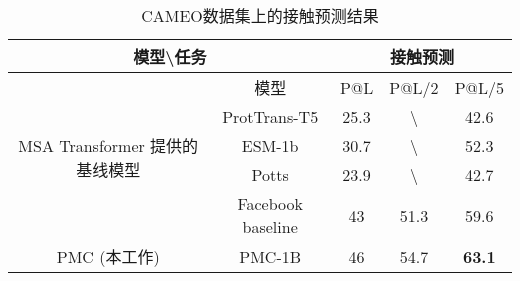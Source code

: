 \begin{table}[htbp]
    \centering
    \begin{tabular}{|cc|ccc|}
    \hline
    \multicolumn{2}{|c|}{模型\textbackslash{}任务} & \multicolumn{3}{c|}{接触预测}                                               \\ \hline
    \multicolumn{1}{|c|}{\multirow{5}{*}{MSA Transformer 提供的基线模型}} & 模型          & \multicolumn{1}{c|}{P@L} & \multicolumn{1}{c|}{P@L/2} & P@L/5         \\ \cline{2-5} 
    \multicolumn{1}{|c|}{} & ProtTrans-T5      & \multicolumn{1}{c|}{25.3} & \multicolumn{1}{c|}{\textbackslash{}} & 42.6 \\ \cline{2-5} 
    \multicolumn{1}{|c|}{} & ESM-1b            & \multicolumn{1}{c|}{30.7} & \multicolumn{1}{c|}{\textbackslash{}} & 52.3 \\ \cline{2-5} 
    \multicolumn{1}{|c|}{} & Potts             & \multicolumn{1}{c|}{23.9} & \multicolumn{1}{c|}{\textbackslash{}} & 42.7 \\ \cline{2-5} 
    \multicolumn{1}{|c|}{} & Facebook baseline & \multicolumn{1}{c|}{43}   & \multicolumn{1}{c|}{51.3}             & 59.6 \\ \hline
    \multicolumn{1}{|c|}{PMC (本工作)}                       & PMC-1B & \multicolumn{1}{c|}{46}  & \multicolumn{1}{c|}{54.7}  & \textbf{63.1} \\ \hline
    \end{tabular}
    \caption{CAMEO数据集上的接触预测结果}
    \label{tab:cameo}
\end{table}



